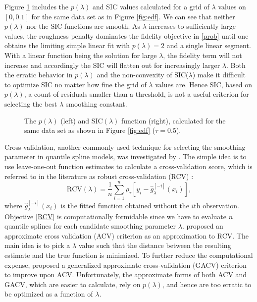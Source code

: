 \documentclass{statsoc}
\begin{document}
Figure \ref{fig:SIC} includes the $p(\lambda)$ and SIC values calculated for a grid of $\lambda$ values on $[0,0.1]$ for the same data set as in Figure \ref{fig:edf}. We can see that neither $p(\lambda)$ nor the SIC functions are  smooth. As $\lambda$ increases to sufficiently large values, the roughness penalty dominates the fidelity objective in \eqref{prob} until one obtains the limiting simple linear fit with $p(\lambda) = 2$ and a single linear segment. With a linear function being the solution for large $\lambda$, the fidelity term will not increase and accordingly the SIC will flatten out for increasingly larger $\lambda$. Both the erratic behavior in $p(\lambda)$ and the non-convexity of SIC($\lambda$) make it difficult to optimize SIC no matter how fine the grid of $\lambda$ values are. Hence SIC, based on $p(\lambda)$,  a count of residuals smaller than a threshold, is not a useful criterion for selecting the best $\lambda$ smoothing constant.

\begin{figure}[H]
\centering   
  \caption{The $p(\lambda)$ (left) and SIC$(\lambda)$ function (right), calculated for the same data set as shown in Figure \ref{fig:edf} ($\tau=0.5$).}
\label{fig:SIC}
\end{figure}

Cross-validation, another commonly used technique for selecting the smoothing parameter in quantile spline models, was investigated by \citet{yuan2006gacv}. The simple idea is to use leave-one-out function estimates to calculate a cross-validation score, which is referred to in the literature as robust cross-validation (RCV) \citep{oh2004period}:
  \begin{equation}
     \label{RCV}
     \text{RCV}(\lambda)=\frac{1}{n} \sum_{i=1}^n \rho_{\tau}[y_i-\hat{g}_{\lambda}^{[-i]}(x_i)],
 \end{equation}
where $\hat{g}_{\lambda}^{[-i]}(x_i)$ is the fitted function obtained without the $i$th observation. Objective \eqref{RCV} is computationally formidable since we have to evaluate $n$ quantile splines for each candidate smoothing parameter $\lambda$. \citet{nychka1995nonparametric} proposed an approximate cross validation (ACV) criterion as an approximation to RCV. The main idea is to pick a $\lambda$ value such that the distance between the resulting estimate and the true function is minimized. To further reduce the computational expense, \citet{yuan2006gacv} proposed a generalized approximate cross-validation (GACV) criterion to improve upon ACV.  Unfortunately, the approximate forms of both ACV and GACV, which are easier to calculate, rely on $p(\lambda)$, and hence are too erratic to be optimized as a function of $\lambda$. 
 
\end{document}
